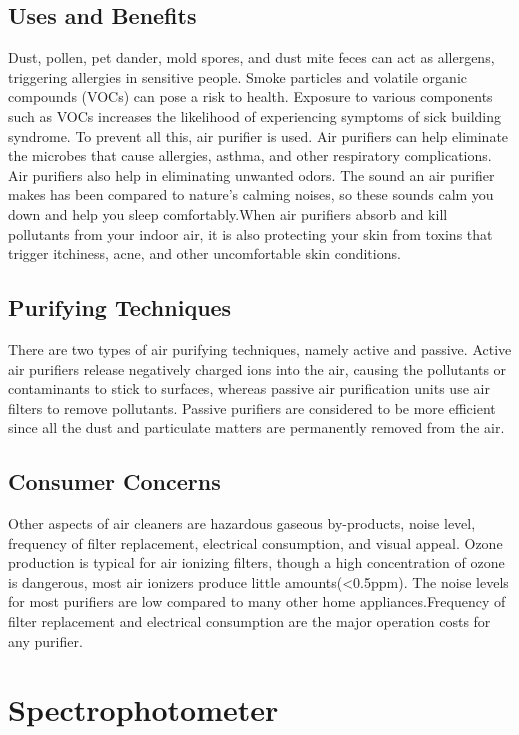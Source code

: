 \documentclass[12pt]{article}
\begin{document}
\subsection{Uses and Benefits}

Dust, pollen, pet dander, mold spores, and dust mite feces can act as allergens, triggering allergies in sensitive people. Smoke particles and volatile organic compounds (VOCs) can pose a risk to health. Exposure to various components such as VOCs increases the likelihood of experiencing symptoms of sick building syndrome. To prevent all this, air purifier is used. Air purifiers can help eliminate the microbes that cause allergies, asthma, and other respiratory complications. Air purifiers also help in eliminating unwanted odors. The sound an air purifier makes has been compared to nature's calming noises, so these sounds calm you down and help you sleep comfortably.When air purifiers absorb and kill pollutants from your indoor air, it is also protecting your skin from toxins that trigger itchiness, acne, and other uncomfortable skin conditions.

\subsection{Purifying Techniques}

There are two types of air purifying techniques, namely active and passive. Active air purifiers release negatively charged ions into the air, causing the pollutants or contaminants to stick to surfaces, whereas passive air purification units use air filters to remove pollutants. Passive purifiers are considered to be more efficient since all the dust and particulate matters are permanently removed from the air.


\subsection{Consumer Concerns}

Other aspects of air cleaners are hazardous gaseous by-products, noise level, frequency of filter replacement, electrical consumption, and visual appeal. Ozone production is typical for air ionizing filters, though a high concentration of ozone is dangerous, most air ionizers produce little amounts(<0.5ppm). The noise levels for most purifiers are low compared to many other home appliances.Frequency of filter replacement and electrical consumption are the major operation costs for any purifier.


\section{Spectrophotometer}
\end{document}
